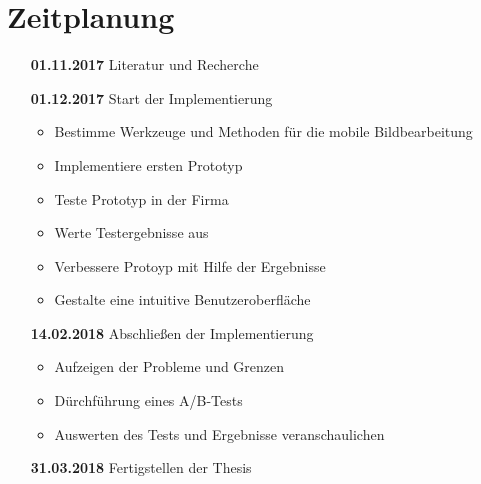 \documentclass[a4paper]{article}
\begin{document}
\section*{Zeitplanung}
\begin{itemize}
	\item[\textbf{01.11.2017}] Literatur und Recherche
	\item[\textbf{01.12.2017}] Start der Implementierung
		\begin{itemize}
			\item Bestimme Werkzeuge und Methoden für die mobile Bildbearbeitung
			\item Implementiere ersten Prototyp
			\item Teste Prototyp in der Firma
			\item Werte Testergebnisse aus
			\item Verbessere Protoyp mit Hilfe der Ergebnisse
			\item Gestalte eine intuitive Benutzeroberfläche 
		\end{itemize}
	\item[\textbf{14.02.2018}] Abschließen der Implementierung
		\begin{itemize}
			\item Aufzeigen der Probleme und Grenzen
			\item Dürchführung eines A/B-Tests
			\item Auswerten des Tests und Ergebnisse veranschaulichen
		\end{itemize}
	\item[\textbf{31.03.2018}] Fertigstellen der Thesis
\end{itemize}
\end{document}
